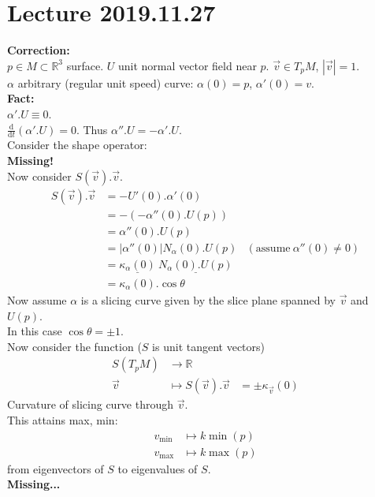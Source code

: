 \documentclass{article}
\renewcommand{\d}{\mathrm{d}}
\newcommand{\R}{\mathbb{R}}
\newcommand{\dv}[2]{\frac{\d #1}{\d #2}}
\newcommand{\abs}[1]{\left|#1\right|}
\theoremstyle{definition}
\theoremstyle{remark}
\theoremstyle{example}
\begin{document}
	\section*{Lecture 2019.11.27}
	\textbf{Correction:}\\
	$p \in M \subset \R^3$ surface. $U$ unit normal vector field near $p$. $\vec{v} \in T_pM$, $\abs{\vec{v}}=1$.\\
	$\alpha$ arbitrary (regular unit speed) curve: $\alpha(0)=p$, $\alpha'(0)=v$.\\
	\textbf{Fact:}\\
	$\alpha'.U \equiv 0$.\\
	$\dv{}{t}\left(\alpha'.U\right)=0$. Thus $\alpha''.U=-\alpha'.U$.\\
	Consider the shape operator:\\
	\textbf{Missing!}\\
	Now consider $S(\vec{v}).\vec{v}$. \begin{align*}
		S(\vec{v}).\vec{v}&=-U'(0).\alpha'(0)\\
		&=-\left(-\alpha''(0).U(p)\right)\\
		&=\alpha''(0).U(p)\\
		&=\abs{\alpha''(0)}N_\alpha(0).U(p) & (\mathrm{assume} \ \alpha''(0) \neq 0)\\
		&=\underline{\kappa_\alpha(0)}\ \underline{N_\alpha(0).U(p)}\\
		&=\kappa_\alpha(0).\cos\theta
	\end{align*}
	Now assume $\alpha$ is a slicing curve given by the slice plane spanned by $\vec{v}$ and $U(p)$.\\
	In this case $\cos \theta= \pm 1$.\\
	Now consider the function ($S$ is unit tangent vectors) \begin{align*}
		S(T_pM)&\to\R\\
		\vec{v}& \mapsto S(\vec{v}).\vec{v} & = \pm \kappa_{\vec{v}}(0)
	\end{align*}
	Curvature of slicing curve through $\vec{v}$.\\
	This attains max, min:
	\begin{align*}
		v_{\min}&\mapsto k \min(p)\\
		v_{\max}&\mapsto k \max(p)
	\end{align*}
	from eigenvectors of $S$ to eigenvalues of $S$.\\
	\textbf{Missing...}
	
\end{document}

